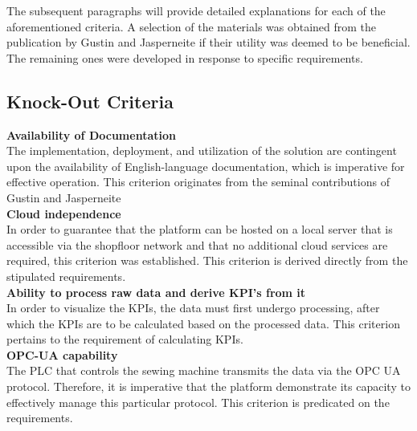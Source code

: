 The subsequent paragraphs will provide detailed explanations for each of the aforementioned criteria. A selection of the materials was obtained from the publication by Gustin and Jasperneite if their utility was deemed to be beneficial. The remaining ones were developed in response to specific requirements.

\subsection{Knock-Out Criteria}
\textbf{Availability of Documentation}\\
The implementation, deployment, and utilization of the solution are contingent upon the availability of English-language documentation, which is imperative for effective operation. This criterion originates from the seminal contributions of  Gustin and Jasperneite\\
\textbf{Cloud independence}\\
In order to guarantee that the platform can be hosted on a local server that is accessible via the shopfloor network and that no additional cloud services are required, this criterion was established. This criterion is derived directly from the stipulated requirements.\\
\textbf{Ability to process raw data and derive KPI's from it}\\
In order to visualize the KPIs, the data must first undergo processing, after which the KPIs are to be calculated based on the processed data. This criterion pertains to the requirement of calculating KPIs. \\
\textbf{OPC-UA capability}\\
The PLC that controls the sewing machine transmits the data via the OPC UA protocol. Therefore, it is imperative that the platform demonstrate its capacity to effectively manage this particular protocol. This criterion is predicated on the requirements.

